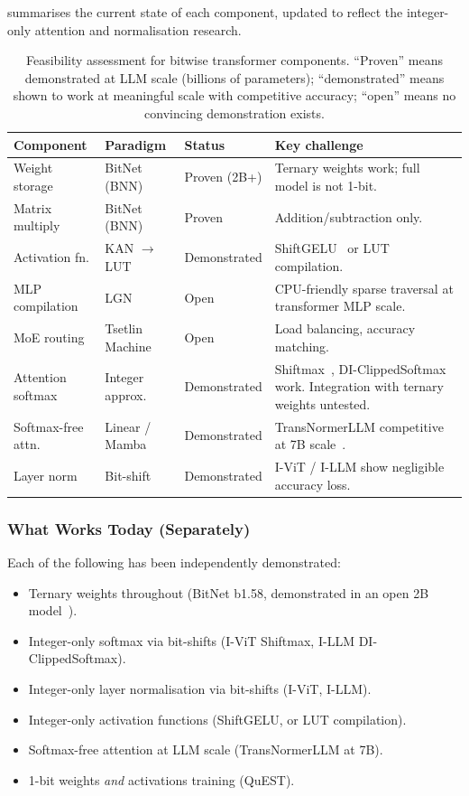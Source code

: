  summarises the current state of each
component, updated to reflect the integer-only attention and
normalisation research.

\begin{table}[htbp]
\centering
\caption{Feasibility assessment for bitwise transformer components.
  ``Proven'' means demonstrated at LLM scale (billions of parameters);
  ``demonstrated'' means shown to work at meaningful scale with
  competitive accuracy; ``open'' means no convincing demonstration
  exists.}
\label{tab:bitwise-llm-summary}
\begin{tabular}{@{}p{3cm}lp{3cm}p{4.5cm}@{}}
  \toprule
  \textbf{Component} & \textbf{Paradigm} & \textbf{Status}
    & \textbf{Key challenge} \\
  \midrule
  Weight storage & BitNet (BNN) & Proven (2B+) & Ternary weights work; full model is not 1-bit. \\
  Matrix multiply & BitNet (BNN) & Proven & Addition/subtraction only. \\
  Activation fn. & KAN $\to$ LUT & Demonstrated & ShiftGELU~\cite{li2022ivit} or LUT compilation. \\
  MLP compilation & LGN & Open & CPU-friendly sparse traversal at transformer MLP scale. \\
  MoE routing & Tsetlin Machine & Open & Load balancing, accuracy matching. \\
  Attention softmax & Integer approx. & Demonstrated & Shiftmax~\cite{li2022ivit}, DI-ClippedSoftmax~\cite{hu2024illm} work. Integration with ternary weights untested. \\
  Softmax-free attn. & Linear / Mamba & Demonstrated & TransNormerLLM competitive at 7B scale~\cite{qin2023transnormerllm}. \\
  Layer norm & Bit-shift & Demonstrated & I-ViT / I-LLM show negligible accuracy loss. \\
  \bottomrule
\end{tabular}
\end{table}

\subsubsection{What Works Today (Separately)}

Each of the following has been independently demonstrated:
\begin{itemize}[leftmargin=2em]
  \item Ternary weights throughout (BitNet b1.58, demonstrated in an
    open 2B model~\cite{ma2025bitnet2b4t}).
  \item Integer-only softmax via bit-shifts (I-ViT Shiftmax,
    I-LLM DI-ClippedSoftmax).
  \item Integer-only layer normalisation via bit-shifts (I-ViT,
    I-LLM).
  \item Integer-only activation functions (ShiftGELU, or
    LUT compilation).
  \item Softmax-free attention at LLM scale (TransNormerLLM at 7B).
  \item 1-bit weights \emph{and} activations training (QuEST).
\end{itemize}

